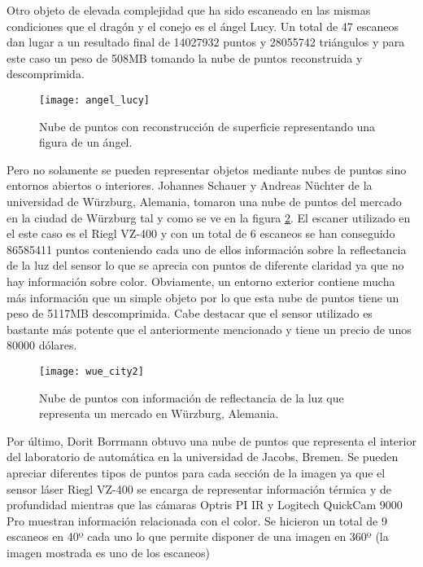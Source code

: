 Otro objeto de elevada complejidad que ha sido escaneado en las mismas condiciones que el dragón y el conejo es el ángel Lucy\cite{pcl_conejo_stanford}. Un total de 47 escaneos dan lugar a un resultado final de 14027932 puntos y 28055742 triángulos y para este caso un peso de 508MB tomando la nube de puntos reconstruida y descomprimida.

\begin{figure}
\centering
\texttt{[image: angel\_lucy]}
\caption{Nube de puntos con reconstrucción de superficie representando una figura de un ángel.}\label{fig:angel_lucy}
\end{figure}

Pero no solamente se pueden representar objetos mediante nubes de puntos sino entornos abiertos o interiores. Johannes Schauer y Andreas Nüchter de la universidad de Würzburg, Alemania, tomaron una nube de puntos\cite{pcd_exteriores} del mercado en la ciudad de Würzburg tal y como se ve en la figura \ref{fig:wue_city}.
El escaner utilizado en el este caso es el Riegl VZ-400\cite{escaner_riegl} y con un total de 6 escaneos se han conseguido 86585411 puntos conteniendo cada uno de ellos información sobre la reflectancia de la luz del sensor lo que se aprecia con puntos de diferente claridad ya que no hay información sobre color. Obviamente, un entorno exterior contiene mucha más información que un simple objeto por lo que esta nube de puntos tiene un peso de 5117MB descomprimida. Cabe destacar que el sensor utilizado es bastante más potente que el anteriormente mencionado y tiene un precio de unos 80000 dólares.



\begin{figure}
\centering
\texttt{[image: wue\_city2]}
\caption{Nube de puntos con información de reflectancia de la luz que representa un mercado en Würzburg, Alemania.}\label{fig:wue_city}
\end{figure}

Por último, Dorit Borrmann obtuvo una nube de puntos\cite{pcd_exteriores} que representa el interior del laboratorio de automática en la universidad de Jacobs, Bremen. Se pueden apreciar diferentes tipos de puntos para cada sección de la imagen ya que el sensor láser Riegl VZ-400 se encarga de representar información térmica y de profundidad mientras que las cámaras Optris PI IR y Logitech QuickCam 9000 Pro muestran información relacionada con el color. Se hicieron un total de 9 escaneos en 40º cada uno lo que permite disponer de una imagen en 360º (la imagen mostrada es uno de los escaneos)

